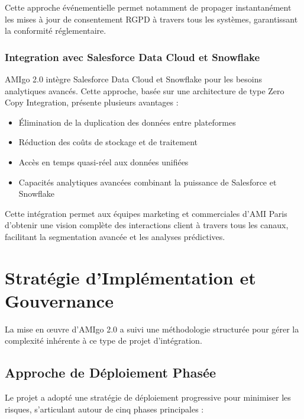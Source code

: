 Cette approche événementielle permet notamment de propager instantanément les mises à jour de consentement RGPD à travers tous les systèmes, garantissant la conformité réglementaire.

\subsubsection{Integration avec Salesforce Data Cloud et Snowflake}

AMIgo 2.0 intègre Salesforce Data Cloud et Snowflake pour les besoins analytiques avancés. Cette approche, basée sur une architecture de type Zero Copy Integration, présente plusieurs avantages :

\begin{itemize}
    \item Élimination de la duplication des données entre plateformes
    \item Réduction des coûts de stockage et de traitement
    \item Accès en temps quasi-réel aux données unifiées
    \item Capacités analytiques avancées combinant la puissance de Salesforce et Snowflake
\end{itemize}

Cette intégration permet aux équipes marketing et commerciales d'AMI Paris d'obtenir une vision complète des interactions client à travers tous les canaux, facilitant la segmentation avancée et les analyses prédictives.

\section{Stratégie d'Implémentation et Gouvernance}

La mise en œuvre d'AMIgo 2.0 a suivi une méthodologie structurée pour gérer la complexité inhérente à ce type de projet d'intégration.

\subsection{Approche de Déploiement Phasée}

Le projet a adopté une stratégie de déploiement progressive pour minimiser les risques, s'articulant autour de cinq phases principales :

